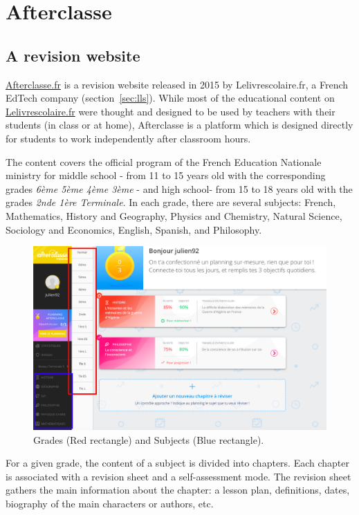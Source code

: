 \chapter{Afterclasse}
\section{A revision website}
\href{https://www.afterclasse.fr}{Afterclasse.fr} is a revision website released in 2015 by Lelivrescolaire.fr, a French EdTech company (section~\ref{sec:lls}). While most of the educational content on \href{https://www.lelivrescolaire.fr}{Lelivrescolaire.fr} were thought and designed to be used by teachers with their students (in class or at home), Afterclasse is a platform which is designed directly for students to work independently after classroom hours. 

The content covers the official program of the French Education Nationale ministry for middle school - from 11 to 15 years old with the corresponding grades \emph{6ème 5ème 4ème 3ème} - and high school- from 15 to 18 years old with the grades \emph{2nde 1ère Terminale}. In each grade, there are several subjects: French, Mathematics, History and Geography, Physics and Chemistry, Natural Science, Sociology and Economics, English, Spanish, and Philosophy. 

\begin{figure}[!ht]
\centering
\includegraphics[clip, width= \textwidth]{2literature/fig/afterclasse.png}
\caption{Grades (Red rectangle) and Subjects (Blue rectangle). }
\label{fig:afterclasse}
\end{figure}

For a given grade, the content of a subject is divided into chapters.  Each chapter is associated with a revision sheet and a self-assessment mode. The revision sheet gathers the main information about the chapter: a lesson plan, definitions, dates, biography of the main characters or authors, etc.

